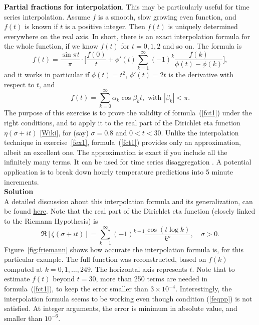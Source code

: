 \documentclass[oneside,10pt]{book}
\begin{document}
\begin{Exercise}{\bf Partial fractions for interpolation}. This may be particularly useful for time series interpolation. Assume $f$ is a smooth, slow growing even function, and $f(t)$ is known if $t$ is a positive integer. Then $f(t)$ is uniquely determined everywhere on the real axis. In short, there is an exact interpolation formula for the whole function, if we know $f(t)$ for $t=0,1,2$ and so on. The formula is
\begin{equation}
f(t) = \frac{\sin\pi t}{\pi}\cdot \Big[\frac{f(0)}{t} +\phi'(t)\sum_{k=1}^\infty (-1)^k \frac{f(k)}{\phi(t)-\phi(k)}
\Big],\label{fct1}
\end{equation}
and it works in particular if $\phi(t)=t^2$, $\phi'(t)=2t$ is the derivative with respect to $t$, and
\begin{equation}
f(t)=\sum_{k=0}^\infty \alpha_k \cos \beta_k t, \mbox{ with } |\beta_k|<\pi. \label{feqpp}
\end{equation}
The purpose of this exercise is to prove the validity of formula~(\ref{fct1}) under the right conditions, and to apply it to the real part of the Dirichlet eta function $\eta(\sigma+it)$
 [\href{https://en.wikipedia.org/wiki/Dirichlet_eta_function}{Wiki}], for (say)
$\sigma=0.8$ and $0<t<30$. Unlike the interpolation technique in exercise~\ref{fex1}, formula~(\ref{fct1}) provides only an approximation, albeit an excellent one. The approximation is exact
 if you include all the infinitely many terms. It can be used for \textcolor{index}{time series disaggregation} \cite{vgsmith}. 
A potential application is to break down hourly temperature predictions into 5 minute increments.\vspace{1ex} \\
{\bf Solution} \vspace{1ex} \\
A detailed discussion about this interpolation formula and its generalization, can be found \href{https://mathoverflow.net/questions/376081/infinite-partial-fraction-expansions-to-compute-fractional-iterations-and-recurr}{here}. Note that the real part of the Dirichlet eta function (closely linked to the \textcolor{index}{Riemann Hypothesis}) is
$$
\Re[\zeta(\sigma+it)]=\sum_{k=1}^\infty (-1)^{k+1}\frac{\cos(t\log k)}{k^\sigma}, \quad \sigma>0.
$$
Figure~\ref{fig:friemann} shows how accurate the interpolation formula is, for this particular example. The full function was reconstructed, based on $f(k)$ computed at $k=0,1,\dots,249$. The horizontal axis represents $t$. Note that to estimate $f(t)$ beyond $t=30$, more than 250 terms are needed in formula~(\ref{fct1}),
to keep the error smaller than $3\times 10^{-4}$. Interestingly, the interpolation formula seems to be working even though condition (\ref{feqpp}) is not satisfied. At integer arguments, the error is minimum in absolute value, and smaller than $10^{-6}$. 


\end{Exercise}
\end{document}
